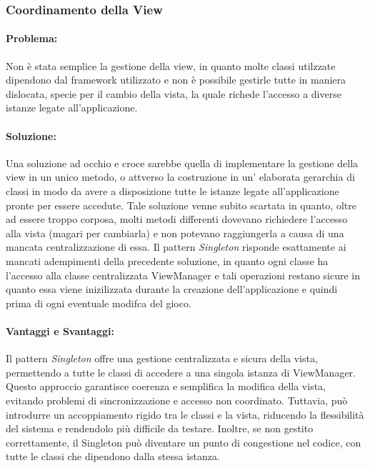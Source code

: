 \documentclass[a4paper,12pt]{report}
\begin{document}
	
	\subsubsection{Coordinamento della View}
	
	\paragraph{Problema:} Non è stata semplice la gestione della view, in quanto molte classi utilzzate dipendono dal framework utilizzato e non è possibile gestirle tutte in maniera dislocata, specie per il cambio della vista, la quale richede l'accesso a diverse istanze legate all'applicazione.
	
	\paragraph{Soluzione:} Una soluzione ad occhio e croce sarebbe quella di implementare la gestione della view in un unico metodo, o attverso la costruzione in un' elaborata gerarchia di classi in modo da avere a disposizione tutte le istanze legate all'applicazione pronte per essere accedute. Tale soluzione venne subito scartata in quanto, oltre ad essere troppo corposa, molti metodi differenti dovevano richiedere
	l'accesso alla vista (magari per cambiarla) e non potevano raggiungerla a causa di una mancata centralizzazione di essa. Il pattern \textit{Singleton} risponde esattamente ai mancati adempimenti della precedente soluzione, in quanto ogni classe ha l'accesso alla classe centralizzata {ViewManager} e tali operazioni restano sicure in quanto essa viene inizilizzata durante la creazione dell'applicazione e quindi prima di ogni eventuale modifca del gioco.
	
	\paragraph{Vantaggi e Svantaggi:} Il pattern \textit{Singleton} offre una gestione centralizzata e sicura della vista, permettendo a tutte le classi di accedere a una singola istanza di ViewManager. Questo approccio garantisce coerenza e semplifica la modifica della vista, evitando problemi di sincronizzazione e accesso non coordinato. Tuttavia, può introdurre un accoppiamento rigido tra le classi e la vista, riducendo la flessibilità del sistema e rendendolo più difficile da testare. Inoltre, se non gestito correttamente, il Singleton può diventare un punto di congestione nel codice, con tutte le classi che dipendono dalla stessa istanza.
	
\end{document}
